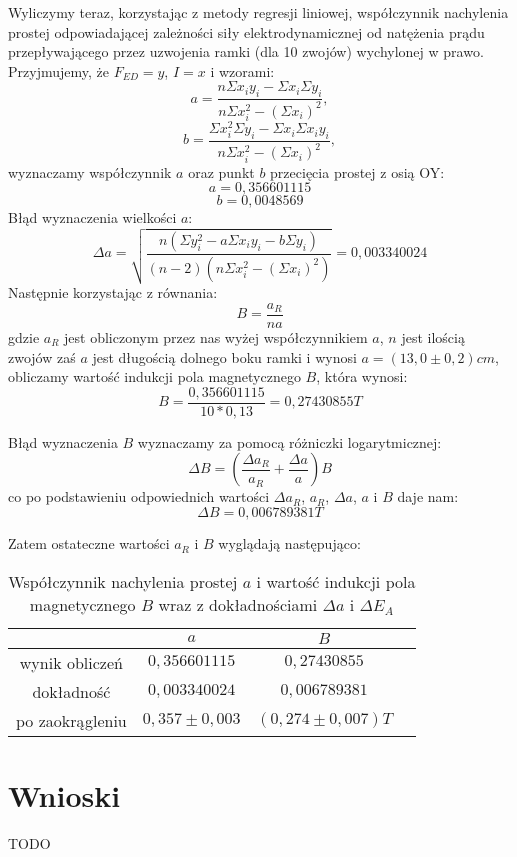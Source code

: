 \documentclass[10pt,a4paper]{article}
\newcommand{\forceindent}{\leavevmode{\parindent=3em\indent}}
\begin{document}
\forceindent Wyliczymy teraz, korzystając z metody regresji liniowej, współczynnik nachylenia prostej odpowiadającej zależności siły elektrodynamicznej od natężenia prądu przepływającego przez uzwojenia ramki (dla 10 zwojów) wychylonej w prawo.\\
Przyjmujemy, że $F_{ED} = y$, $I = x$ i wzorami:
\begin{equation}
a=\frac{n\Sigma x_i y_i - \Sigma x_i \Sigma y_i}{n\Sigma x_i^2 - (\Sigma x_i)^2},
\end{equation}
\begin{equation}
b=\frac{\Sigma x_i^2 \Sigma y_i - \Sigma x_i \Sigma x_i y_i}{n \Sigma x_i^2 - (\Sigma x_i)^2},
\end{equation}
wyznaczamy współczynnik $a$ oraz punkt $b$ przecięcia prostej z osią OY:
\begin{equation}
a = 0,356601115 
\end{equation}
\begin{equation}
b = 0,0048569 
\end{equation}
Błąd wyznaczenia wielkości $a$:\\
$$ \Delta a = \sqrt{\frac{n(\Sigma y_i ^2 - a \Sigma x_i y_i - b\Sigma y_i)}{(n-2)(n \Sigma x_i ^2 - (\Sigma x_i)^2)}} = 0,003340024$$
Następnie korzystając z równania:
\begin{equation}
B = \frac{a_R}{na}
\end{equation}
gdzie $a_R$ jest obliczonym przez nas wyżej współczynnikiem $a$, $n$ jest ilością zwojów zaś $a$ jest długością dolnego boku ramki i wynosi $a = (13,0 \pm 0,2) cm$,
obliczamy wartość indukcji pola magnetycznego $B$, która wynosi:
$$ B = \frac{0,356601115}{10*0,13} = 0,27430855 T $$

Błąd wyznaczenia $B$ wyznaczamy za pomocą różniczki logarytmicznej:
$$ \Delta B = \left ( \frac{\Delta a_R}{a_R} + \frac{\Delta a}{a}  \right ) B$$
co po podstawieniu odpowiednich wartości $\Delta a_R$, $a_R$, $\Delta a$, $a$ i $B$ daje nam:
$$ \Delta B = 0,006789381 T $$


\forceindent Zatem ostateczne wartości $a_R$ i $B$ wyglądają następująco:

\begin{table}[!h]
\centering
\begin{tabular}{|cc||c|c|}
\multicolumn{1}{c}{} & \multicolumn{1}{c}{$a$} & \multicolumn{1}{c}{$B$}\\
\hline
wynik obliczeń & $0,356601115$ & $0,27430855$ \\
\hline
dokładność & $0,003340024$ & $0,006789381$\\
\hline
po zaokrągleniu & $0,357 \pm 0,003$  & $(0,274 \pm 0,007) T $\\
\hline
\end{tabular}
\caption{Współczynnik nachylenia prostej $a$ i wartość indukcji pola magnetycznego $B$ wraz z dokładnościami $\Delta a$ i $\Delta E_A$}
\end{table}

\section*{Wnioski}
\forceindent TODO
\end{document}
